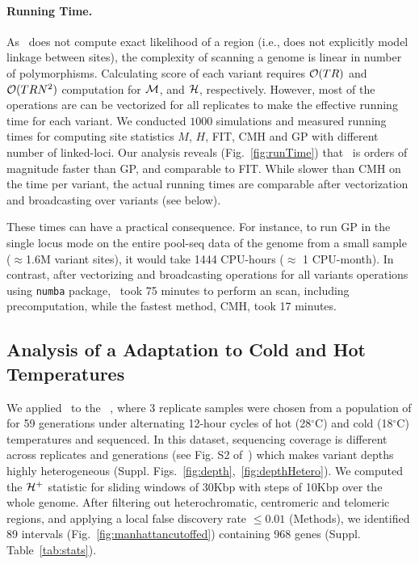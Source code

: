 \paragraph{Running Time.}
As \comale\ does not compute exact likelihood of a region (i.e., does
not explicitly model linkage between sites), the complexity of
scanning a genome is linear in number of polymorphisms.  Calculating
score of each variant requires ${\cal O}(TR)$ and ${\cal O}(TRN^2)$ computation
for ${\cal M}$, and ${\cal H}$, respectively. However, most of the operations
are can be vectorized for all replicates to make the effective running
time for each variant.  We
conducted $1000$ simulations and measured running times for computing site 
statistics $M$, $H$, FIT, CMH and GP with different number of linked-loci.  Our
analysis reveals (Fig.~\ref{fig:runTime}) that \comale\ is orders of
magnitude faster than GP, and comparable to FIT. While slower than CMH
on the time per variant, the actual running times are comparable after
vectorization and broadcasting over variants (see below).

These times can have a practical consequence. For instance, to run GP
in the single locus mode on the entire pool-seq data of the \dmel genome from a
small sample ($\approx$1.6M variant sites), it would take 1444 CPU-hours
($\approx$ 1 CPU-month). In contrast, after vectorizing and
broadcasting operations for all variants operations using
\texttt{numba} package, \comale\ took 75 minutes to perform an
scan, including precomputation, while the fastest method, CMH, took 17 minutes.

\subsection{Analysis of a \dmel Adaptation to Cold and Hot 
Temperatures}\label{sec:dmel}
We applied \comale\ to the \datadm~\cite{orozco2012adaptation}, where 3
replicate samples were chosen from a population of \dmel for 59
generations under alternating 12-hour cycles of hot (28$^{\circ}$C)
and cold (18$^{\circ}$C) temperatures and sequenced.  In this dataset,
sequencing coverage is different across replicates and generations
(see Fig. S2 of~\cite{Terhorst2015Multi}) which makes variant depths
highly heterogeneous (Suppl.
Figs.~\ref{fig:depth},~\ref{fig:depthHetero}). We computed the
${\cal H}^{+}$ statistic for sliding windows of 30Kbp with steps of 10Kbp
over the whole genome. After filtering out
heterochromatic, centromeric and telomeric 
regions\cite{fiston2010drosophila,comeron2012many}, and
applying a local false discovery rate $\le 0.01$ (Methods), we
identified 89 intervals (Fig.~\ref{fig:manhattancutoffed}) containing
968 genes (Suppl. Table~\ref{tab:stats}).

